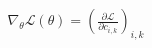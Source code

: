 \documentclass[preview]{standalone}
\begin{document}
\begin{align*}
\nabla _ \theta  \mathcal{L}( \theta ) = ( \frac{\partial \mathcal{L}}{\partial c_{i,k}} )_{i,k}
\end{align*}
\end{document}
